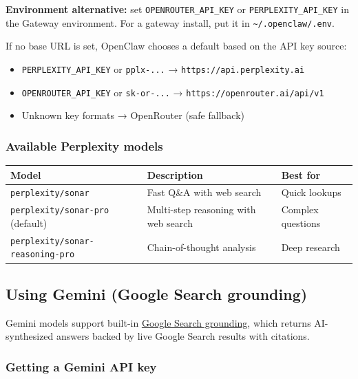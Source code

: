 \textbf{Environment alternative:} set \texttt{OPENROUTER\_API\_KEY} or \texttt{PERPLEXITY\_API\_KEY} in the Gateway
environment. For a gateway install, put it in \texttt{\textasciitilde{}/.openclaw/.env}.

If no base URL is set, OpenClaw chooses a default based on the API key source:

\begin{itemize}
  \item \texttt{PERPLEXITY\_API\_KEY} or \texttt{pplx-...} → \texttt{https://api.perplexity.ai}
  \item \texttt{OPENROUTER\_API\_KEY} or \texttt{sk-or-...} → \texttt{https://openrouter.ai/api/v1}
  \item Unknown key formats → OpenRouter (safe fallback)
\end{itemize}


\subsubsection{Available Perplexity models}



\begin{table}[h]
\centering
\small
\begin{tabular}{|l|l|l|}
\hline
Model & Description & Best for \\
\hline
\texttt{perplexity/sonar} & Fast Q\&A with web search & Quick lookups \\
\hline
\texttt{perplexity/sonar-pro} (default) & Multi-step reasoning with web search & Complex questions \\
\hline
\texttt{perplexity/sonar-reasoning-pro} & Chain-of-thought analysis & Deep research \\
\hline
\end{tabular}
\end{table}



\subsection{Using Gemini (Google Search grounding)}


Gemini models support built-in \href{https://ai.google.dev/gemini-api/docs/grounding}{Google Search grounding},
which returns AI-synthesized answers backed by live Google Search results with citations.

\subsubsection{Getting a Gemini API key}


